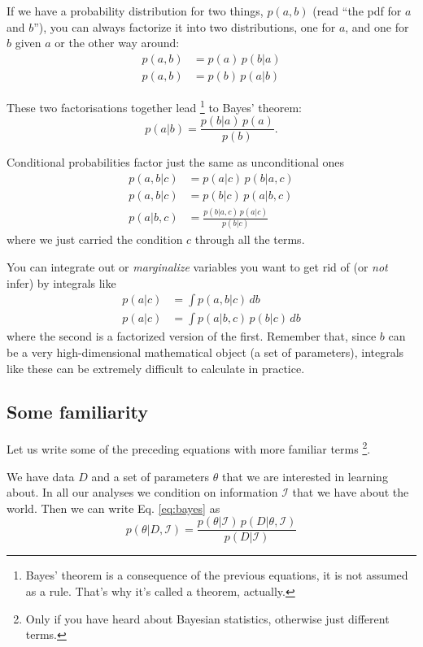\documentclass[a4paper,11pt]{article}
\begin{document}
If we have a probability distribution for two things, $p(a,b)$ (read ``the pdf for $a$ and
$b$''), you can always factorize it into two distributions, one for $a$, and one for $b$ given $a$ or the other way around:
%
\begin{align}
	p(a,b) &= p(a) \, p(b|a)\\
	p(a,b) &= p(b) \, p(a|b)
\end{align}
%

These two factorisations together lead%
\footnote{Bayes' theorem is a consequence of the previous equations, it is not assumed as a rule. That's why it's called a theorem, actually.} to Bayes' theorem:
%
\begin{equation}
	p(a|b) = \frac{p(b|a)\,p(a)}{p(b)} .
\end{equation}
%

Conditional probabilities factor just the same as unconditional ones
%
\begin{align}
	p(a,b|c) &= p(a|c) \, p(b|a,c)\\
	p(a,b|c) &= p(b|c) \, p(a|b,c)\\
	p(a|b,c) &= \frac{p(b|a,c)\,p(a|c)}{p(b|c)} \label{eq:bayes}
\end{align}
%	
where we just carried the condition $c$ through all the terms.

You can integrate out or \emph{marginalize} variables you want to get rid of (or \emph{not} infer) by integrals like
%
\begin{align}
	p(a|c) &= \int p(a,b|c) \, db \\
	p(a|c) &= \int p(a|b,c)\,p(b|c) \, db
\end{align}
%
where the second is a factorized version of the first.
Remember that, since $b$ can be a very high-dimensional mathematical object (a set of parameters), integrals like these can be extremely difficult to calculate in practice.


\subsection{Some familiarity}

Let us write some of the preceding equations with more familiar terms%
\footnote{Only if you have heard about Bayesian statistics, otherwise just different terms.}.

\noindent We have data $D$ and a set of parameters $\theta$ that we are interested in learning about. 
In all our analyses we condition on information $\mathcal{I}$ that we have about the world.
Then we can write Eq. \eqref{eq:bayes} as
%
\begin{equation}\label{eq:bayes2}
  p(\theta|D,\mathcal{I}) = \frac{p(\theta|\mathcal{I}) \, p(D|\theta,\mathcal{I})}{p(D|\mathcal{I})}
\end{equation}
\end{document}
